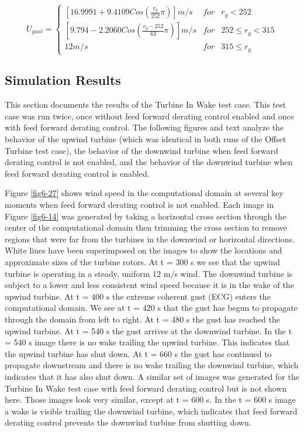 \begin{equation} 
	U_{gust}=\left\{\begin{matrix}
\left [16.9991 +9.4109Cos\left ( \frac{r_g}{252 }\pi  \right )  \right ]m/s & for  & r_g<252\\ 
 \left [9.794 -2.2060Cos\left ( \frac{r_g-252}{63}\pi  \right )  \right ]m/s & for  & 252 \leq r_g <315\\ 
 12 m/s &  for & 315 \leq r_g
\end{matrix}\right. 
\label{eq6-4}
\end{equation}

\subsection{Simulation Results} \label{section6-7-2}

This section documents the results of the Turbine In Wake test case. This test case was run twice, once without feed forward derating control enabled and once with feed forward derating control. The following figures and text analyze the behavior of the upwind turbine (which was identical in both runs of the Offset Turbine test case), the behavior of the downwind turbine when feed forward derating control is not enabled, and the behavior of the downwind turbine when feed forward derating control is enabled.

Figure \ref{fig6-27} shows wind speed in the computational domain at several key moments when feed forward derating control is not enabled. Each image in Figure \ref{fig6-14} was generated by taking a horizontal cross section through the center of the computational domain then trimming the cross section to remove regions that were far from the turbines in the downwind or horizontal directions. White lines have been superimposed on the images to show the locations and approximate sizes of the turbine rotors. At t = 300 s we see that the upwind turbine is operating in a steady, uniform 12 m/s wind. The downwind turbine is subject to a lower and less consistent wind speed because it is in the wake of the upwind turbine. At t = 400 s the extreme coherent gust (ECG) enters the computational domain. We see at t = 420 s that the gust has begun to propagate through the domain from left to right. At t = 480 s the gust has reached the upwind turbine. At t = 540 s the gust arrives at the downwind turbine. In the t = 540 s image there is no wake trailing the upwind turbine. This indicates that the upwind turbine has shut down. At t = 660 s the gust has continued to propagate downstream and there is no wake trailing the downwind turbine, which indicates that it has also shut down. A similar set of images was generated for the Turbine In Wake test case with feed forward derating control but is not shown here. Those images look very similar, except at t = 600 s. In the t = 600 s image a wake is visible trailing the downwind turbine, which indicates that feed forward derating control prevents the downwind turbine from shutting down.


